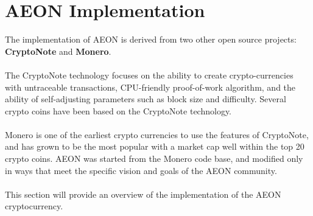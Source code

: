 \section{AEON Implementation}
\label{secImp}

The implementation of AEON is derived from two other open source projects:  \textbf{CryptoNote} and \textbf{Monero}.\\
\\
The CryptoNote technology focuses on the ability to create crypto-currencies with untraceable transactions, CPU-friendly proof-of-work algorithm, and the ability of self-adjusting parameters such as block size and difficulty. Several crypto coins have been based on the CryptoNote technology.\\
\\
Monero is one of the earliest crypto currencies to use the features of CryptoNote, and has grown to be the most popular with a market cap well within the top 20 crypto coins.  AEON was started from the Monero code base, and modified only in ways that meet the specific vision and goals of the AEON community.\\
\\
This section will provide an overview of the implementation of the AEON cryptocurrency.

